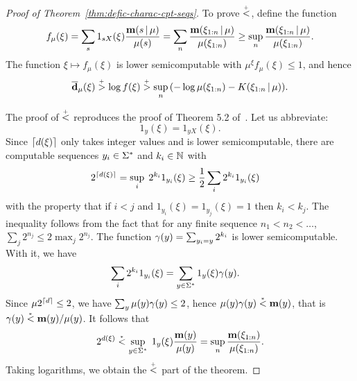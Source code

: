  \begin{proof}[Proof of Theorem~\protect\ref{thm:defic-charac-cpt-seqs}]
  \leanok
To prove \( \stackrel{{}_+}{<} \), define the function
 \[
 f_{\mu}(\xi) = \sum_{s} 1_{sX}(\xi) \frac{\mathbf{m}(s \,\vert\, \mu)}{\mu(s)}
  = \sum_{n} \frac{\mathbf{m}(\xi_{1:n} \,\vert\, \mu)}{\mu(\xi_{1:n})}
  \ge \sup_{n} \frac{\mathbf{m}(\xi_{1:n} \,\vert\, \mu)}{\mu(\xi_{1:n})}.
 \]
The function \( \xi \mapsto f_{\mu}(\xi) \)
is lower semicomputable with \( \mu^{\xi} f_{\mu}(\xi) \le 1 \), and hence
 \[
  \overline{\mathbf{d}}_{\mu}(\xi) \stackrel{{}_+}{>} \log f(\xi) \stackrel{{}_+}{>}
   \sup_{n}{\left( -\log\mu(\xi_{1:n}) - K(\xi_{1:n} \,\vert\, \mu)\right)}.
 \]

The proof of \( \stackrel{{}_+}{<} \) reproduces the proof of Theorem 5.2
of~\cite{GacsExact80}.
Let us abbreviate:
 \begin{equation*}1_{y}(\xi) = 1_{yX}(\xi).
 \end{equation*}
Since \( {\lceil d(\xi)\rceil} \) only takes integer values and is lower semicomputable,
there are computable
sequences \( y_{i} \in \Sigma^{*} \) and \( k_{i} \in \mathbb{N} \) with
 \begin{align*}
   2^{{\lceil d(\xi)\rceil}} &= \sup_{i}\; 2^{k_{i}} 1_{y_{i}}(\xi) \ge
  \frac{1}{2}\sum_{i} 2^{k_{i}} 1_{y_{i}}(\xi)
 \end{align*}
with the property that if \( i<j \) and \( 1_{y_{i}}(\xi)=1_{y_{j}}(\xi)=1 \) then
\( k_{i}<k_{j} \).
The inequality follows from the fact that for any finite sequence
\( n_{1}<n_{2}<\dots \), \( \sum_{j} 2^{n_{j}} \le 2 \max_{j} 2^{n_{j}} \).
The function \( \gamma(y)=\sum_{y_{i}=y}2^{k_{i}} \) is lower semicomputable.
With it, we have
\begin{align*}
\sum_{i} 2^{k_{i}} 1_{y_{i}}(\xi)  &= \sum_{y\in\Sigma^{*}}1_{y}(\xi)\gamma(y).
 \end{align*}
Since \( \mu 2^{{\lceil d\rceil}} \le 2 \), we have \( \sum_{y}\mu(y)\gamma(y) \le 2 \), hence
\( \mu(y)\gamma(y)\stackrel{{}_*}{<}\mathbf{m}(y) \), that is \( \gamma(y)\stackrel{{}_*}{<} \mathbf{m}(y)/\mu(y) \).
It follows that
 \[
   2^{d(\xi)} \stackrel{{}_*}{<} \sup_{y \in \Sigma^{*}}\; 1_{y}(\xi)\frac{\mathbf{m}(y)}{\mu(y)}
  = \sup_{n} \frac{\mathbf{m}(\xi_{1:n})}{\mu(\xi_{1:n})}.
 \]
Taking logarithms, we obtain the \( \stackrel{{}_+}{<} \) part of the theorem.
 \end{proof}

